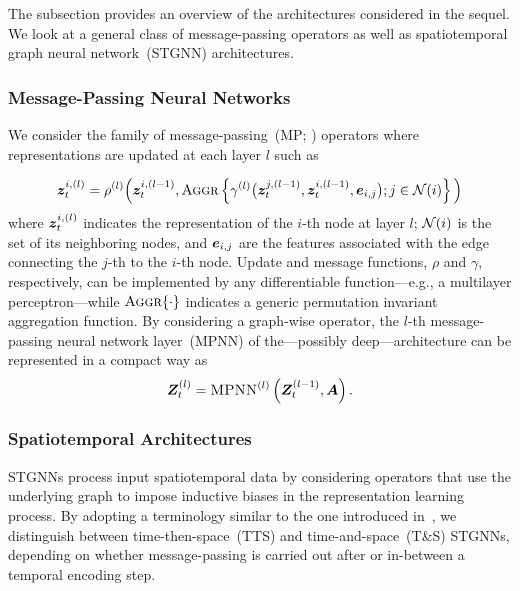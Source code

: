 The subsection provides an overview of the architectures considered in the sequel. We look at a general class of message-passing operators as well as spatiotemporal graph neural network~(STGNN) architectures.

\subsubsection{Message-Passing Neural Networks} 

We consider the family of message-passing~(MP; \citealt{gilmer2017neural}) operators where representations are updated at each layer $l$ such as

\begin{equation}\label{eq:mp}
    {{\bm{z}}}^{i, (l)}_t = \rho^{(l)}\Big({\bm{z}}^{i, (l-1)}_t, {\textsc{Aggr}}\left\{ \gamma^{(l)}\big( {\bm{z}}^{j, (l-1)}_t, {\bm{z}}^{i, (l-1)}_t, {\bm{e}}_{i,j}\big); j\in{\mathcal{N}}(i)\right\}\Big)\\
\end{equation}
where ${{\bm{z}}}^{i, (l)}_t$ indicates the representation of the $i$-th node at layer $l$; ${\mathcal{N}}(i)$ is the set of its neighboring nodes, and ${\bm{e}}_{i,j}$ are the features associated with the edge connecting the $j$-th to the $i$-th node. Update and message functions, $\rho$ and $\gamma$, respectively, can be implemented by any differentiable function---e.g., a multilayer perceptron---while ${\textsc{Aggr}}\{\cdot\}$ indicates a generic permutation invariant aggregation function. By considering a graph-wise operator, the $l$-th message-passing neural network layer~(MPNN) of the---possibly deep---architecture can be represented in a compact way as
\begin{equation}
    {{\bm{Z}}}^{(l)}_t = \textsc{MPNN}^{(l)}\left({\bm{Z}}_t^{(l-1)}, {\bm{A}}\right).
\end{equation}

\subsubsection{Spatiotemporal Architectures} 

STGNNs process input spatiotemporal data by considering operators that use the underlying graph to impose inductive biases in the representation learning process. By adopting a terminology similar to the one introduced in~\citep{gao2021equivalence}, we distinguish between time-then-space~(TTS) and time-and-space~(T\&S) STGNNs, depending on whether message-passing is carried out after or in-between a temporal encoding step.

